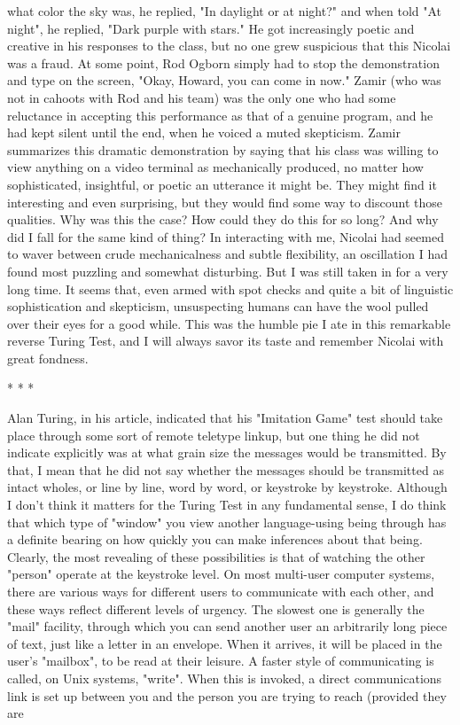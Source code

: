 what color the sky was, he replied, "In daylight or at night?" and when told "At
night", he replied, "Dark purple with stars." He got increasingly poetic and creative in
his responses to the class, but no one grew suspicious that this Nicolai was a fraud. At
some point, Rod Ogborn simply had to stop the demonstration and type on the screen,
"Okay, Howard, you can come in now." Zamir (who was not in cahoots with Rod and
his team) was the only one who had some reluctance in accepting this performance as
that of a genuine program, and he had kept silent until the end, when he voiced a
muted skepticism.
   Zamir summarizes this dramatic demonstration by saying that his class was willing
to view anything on a video terminal as mechanically produced, no matter how
sophisticated, insightful, or poetic an utterance it might be. They might find it
interesting and even surprising, but they would find some way to discount those
qualities. Why was this the case? How could they do this for so long? And why did I
fall for the same kind of thing?
   In interacting with me, Nicolai had seemed to waver between crude
mechanicalness and subtle flexibility, an oscillation I had found most puzzling and
somewhat disturbing. But I was still taken in for a very long time. It seems that, even
armed with spot checks and quite a bit of linguistic sophistication and skepticism,
unsuspecting humans can have the wool pulled over their eyes for a good while. This
was the humble pie I ate in this remarkable reverse Turing Test, and I will always
savor its taste and remember Nicolai with great fondness.

                                        *   *   *

   Alan Turing, in his article, indicated that his "Imitation Game" test should take
place through some sort of remote teletype linkup, but one thing he did not indicate
explicitly was at what grain size the messages would be transmitted. By that, I mean
that he did not say whether the messages should be transmitted as intact wholes, or
line by line, word by word, or keystroke by keystroke. Although I don't think it
matters for the Turing Test in any fundamental sense, I do think that which type of
"window" you view another language-using being through has a definite bearing on
how quickly you can make inferences about that being. Clearly, the most revealing of
these possibilities is that of watching the other "person" operate at the keystroke level.
   On most multi-user computer systems, there are various ways for different users to
communicate with each other, and these ways reflect different levels of urgency. The
slowest one is generally the "mail" facility, through which you can send another user
an arbitrarily long piece of text, just like a letter in an envelope. When it arrives, it
will be placed in the user's "mailbox", to be read at their leisure. A faster style of
communicating is called, on Unix systems, "write". When this is invoked, a direct
communications link is set up between you and the person you are trying to reach
(provided they are




